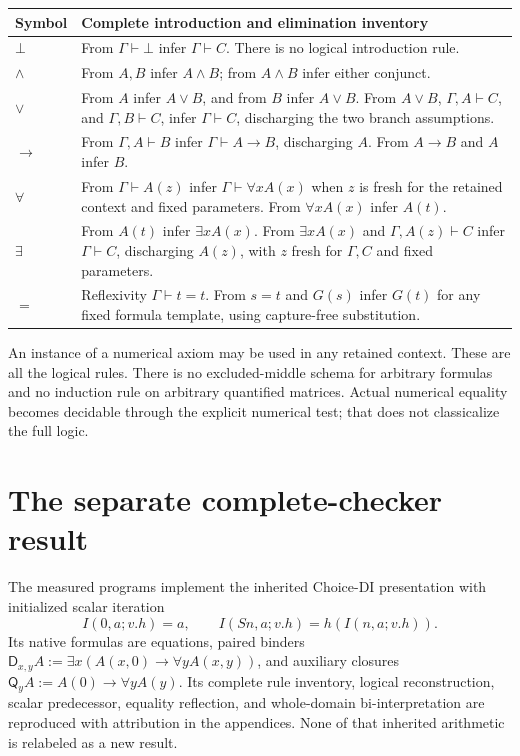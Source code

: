 \documentclass[11pt,letterpaper]{article}
\theoremstyle{definition}\newtheorem{definition}[theorem]{Definition}
\theoremstyle{remark}\newtheorem{remark}[theorem]{Remark}
\newcommand{\D}{\mathsf D}
\newcommand{\Q}{\mathsf Q}
\begin{document}
\begin{center}\small
\begin{tabularx}{\linewidth}{@{}lX@{}}
\toprule
Symbol & Complete introduction and elimination inventory\\\midrule
$\bot$ & From $\Gamma\vdash\bot$ infer $\Gamma\vdash C$.
There is no logical introduction rule.\\[3pt]
$\land$ & From $A,B$ infer $A\land B$; from $A\land B$ infer either conjunct.\\[3pt]
$\lor$ & From $A$ infer $A\lor B$, and from $B$ infer $A\lor B$.
From $A\lor B$, $\Gamma,A\vdash C$, and $\Gamma,B\vdash C$, infer
$\Gamma\vdash C$, discharging the two branch assumptions.\\[3pt]
$\to$ & From $\Gamma,A\vdash B$ infer $\Gamma\vdash A\to B$, discharging
$A$. From $A\to B$ and $A$ infer $B$.\\[3pt]
$\forall$ & From $\Gamma\vdash A(z)$ infer $\Gamma\vdash\forall x A(x)$
when $z$ is fresh for the retained context and fixed parameters.
From $\forall x A(x)$ infer $A(t)$.\\[3pt]
$\exists$ & From $A(t)$ infer $\exists x A(x)$.
From $\exists x A(x)$ and $\Gamma,A(z)\vdash C$ infer $\Gamma\vdash C$,
discharging $A(z)$, with $z$ fresh for $\Gamma,C$ and fixed parameters.\\[3pt]
$=$ & Reflexivity $\Gamma\vdash t=t$.
From $s=t$ and $G(s)$ infer $G(t)$ for any fixed formula template,
using capture-free substitution.\\
\bottomrule
\end{tabularx}
\end{center}
An instance of a numerical axiom may be used in any retained context.
These are all the logical rules. There is no excluded-middle schema for
arbitrary formulas and no induction rule on arbitrary quantified
matrices. Actual numerical equality becomes decidable through the
explicit numerical test; that does not classicalize the full logic.



\section{The separate complete-checker result}
\label{sec:local-kernels}
The measured programs implement the inherited Choice-DI presentation
with initialized scalar iteration
\[
I(0,a;v.h)=a,\qquad I(Sn,a;v.h)=h(I(n,a;v.h)).
\]
Its native formulas are equations, paired binders
$\D_{x,y}A:=\exists x(A(x,0)\to\forall y A(x,y))$, and auxiliary
closures $\Q_yA:=A(0)\to\forall y A(y)$. Its complete rule inventory,
logical reconstruction, scalar predecessor, equality reflection, and
whole-domain bi-interpretation are reproduced with attribution in the
appendices. None of that inherited arithmetic is relabeled as a new result.
\end{document}

